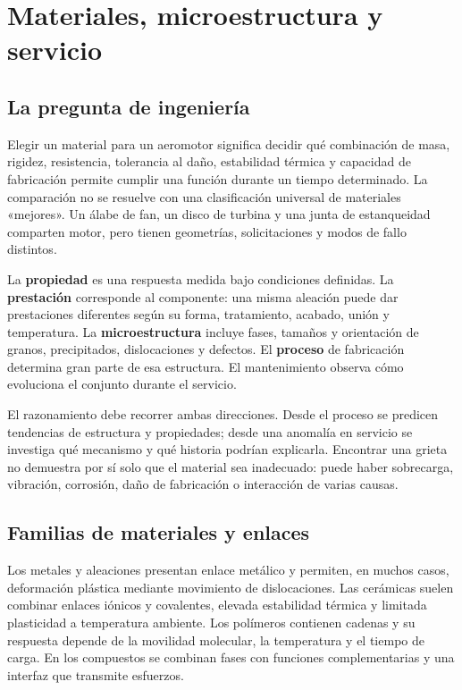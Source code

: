 \chapter{Materiales, microestructura y servicio}
\label{ch:01}
\section{La pregunta de ingeniería}
Elegir un material para un aeromotor significa decidir qué combinación de masa, rigidez, resistencia, tolerancia al daño, estabilidad térmica y capacidad de fabricación permite cumplir una función durante un tiempo determinado. La comparación no se resuelve con una clasificación universal de materiales «mejores». Un álabe de fan, un disco de turbina y una junta de estanqueidad comparten motor, pero tienen geometrías, solicitaciones y modos de fallo distintos.

La \textbf{propiedad} es una respuesta medida bajo condiciones definidas. La \textbf{prestación} corresponde al componente: una misma aleación puede dar prestaciones diferentes según su forma, tratamiento, acabado, unión y temperatura. La \textbf{microestructura} incluye fases, tamaños y orientación de granos, precipitados, dislocaciones y defectos. El \textbf{proceso} de fabricación determina gran parte de esa estructura. El mantenimiento observa cómo evoluciona el conjunto durante el servicio.

El razonamiento debe recorrer ambas direcciones. Desde el proceso se predicen tendencias de estructura y propiedades; desde una anomalía en servicio se investiga qué mecanismo y qué historia podrían explicarla. Encontrar una grieta no demuestra por sí solo que el material sea inadecuado: puede haber sobrecarga, vibración, corrosión, daño de fabricación o interacción de varias causas.
\section{Familias de materiales y enlaces}
Los metales y aleaciones presentan enlace metálico y permiten, en muchos casos, deformación plástica mediante movimiento de dislocaciones. Las cerámicas suelen combinar enlaces iónicos y covalentes, elevada estabilidad térmica y limitada plasticidad a temperatura ambiente. Los polímeros contienen cadenas y su respuesta depende de la movilidad molecular, la temperatura y el tiempo de carga. En los compuestos se combinan fases con funciones complementarias y una interfaz que transmite esfuerzos.

